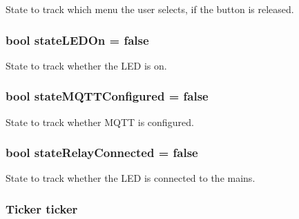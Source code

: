 State to track which menu the user selects, if the button is released. 

\hypertarget{WIFIOnOff_8ino_aa1ef40baec048d45fac1d51afc521d40}{
\subsubsection[{state\-L\-E\-D\-On}]{\setlength{\rightskip}{0pt plus 5cm}bool state\-L\-E\-D\-On = false}}\label{WIFIOnOff_8ino_aa1ef40baec048d45fac1d51afc521d40}


State to track whether the L\-E\-D is on. 

\hypertarget{WIFIOnOff_8ino_a3f27c574110acbefe064ca29a7ce289d}{
\subsubsection[{state\-M\-Q\-T\-T\-Configured}]{\setlength{\rightskip}{0pt plus 5cm}bool state\-M\-Q\-T\-T\-Configured = false}}\label{WIFIOnOff_8ino_a3f27c574110acbefe064ca29a7ce289d}


State to track whether M\-Q\-T\-T is configured. 

\hypertarget{WIFIOnOff_8ino_a48a5ee80a30c37768bf1e198f1ee5692}{
\subsubsection[{state\-Relay\-Connected}]{\setlength{\rightskip}{0pt plus 5cm}bool state\-Relay\-Connected = false}}\label{WIFIOnOff_8ino_a48a5ee80a30c37768bf1e198f1ee5692}


State to track whether the L\-E\-D is connected to the mains. 

\hypertarget{WIFIOnOff_8ino_a4bb2542b2738619fdf76b685b10e315d}{
\subsubsection[{ticker}]{\setlength{\rightskip}{0pt plus 5cm}Ticker ticker}}\label{WIFIOnOff_8ino_a4bb2542b2738619fdf76b685b10e315d}


